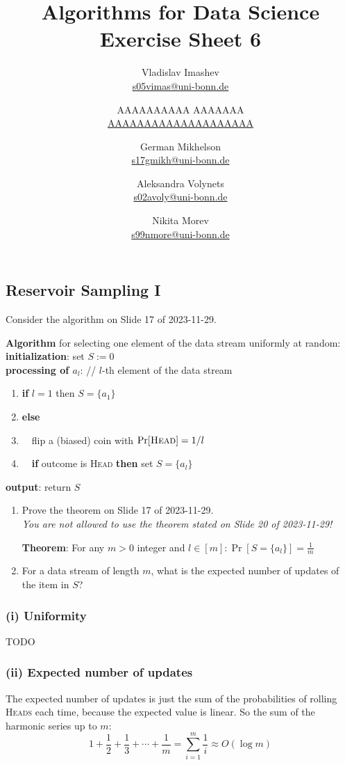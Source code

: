 \documentclass{article}
\title{Algorithms for Data Science \\ Exercise Sheet 6}
\author{
  Vladislav Imashev \\ \href{mailto:s05vimas@uni-bonn.de}{s05vimas@uni-bonn.de} \and
  AAAAAAAAAA AAAAAAA \\ \href{mailto:AAAAAAAAAAAAAAAAAAAA}{AAAAAAAAAAAAAAAAAAAA} \and
  German Mikhelson \\ \href{mailto:s17gmikh@uni-bonn.de}{s17gmikh@uni-bonn.de} \and
  Aleksandra Volynets \\ \href{mailto:s02avoly@uni-bonn.de}{s02avoly@uni-bonn.de} \and
  Nikita Morev \\ \href{mailto:s99nmore@uni-bonn.de}{s99nmore@uni-bonn.de}
}
\begin{document}
  \maketitle

  \setcounter{section}{6}
  \subsection{Reservoir Sampling I}
  \begin{centerframebox}
    Consider the algorithm on Slide 17 of 2023-11-29.

    \textbf{Algorithm} for selecting one element of the data stream uniformly at random: \\
    \textbf{initialization}: set $S := 0$ \\
    \textbf{processing of $a_l$}: // $l$-th element of the data stream
    \begin{enumerate}[topsep=0pt,itemsep=-1ex,partopsep=1ex,parsep=1ex]
      \item \textbf{if} $l = 1$ then $S = \{a_1\}$
      \item \textbf{else}
      \item ~~flip a (biased) coin with $\Pr[\textsc{Head}] = 1/l$
      \item ~~\textbf{if} outcome is \textsc{Head} \textbf{then} set $S = \{a_l\}$
    \end{enumerate}
    \textbf{output}: return $S$

    \begin{enumerate}[label=(\roman*)]
      \item Prove the theorem on Slide 17 of 2023-11-29. \\
      \textit{You are not allowed to use the theorem stated on Slide 20 of 2023-11-29!}

      \textbf{Theorem}: For any $m > 0$ integer and $l \in [m]: \Pr[S = \{a_l\}] = \frac{1}{m}$

      \item For a data stream of length $m$, what is the expected number of updates of the item in $S$?
    \end{enumerate}
  \end{centerframebox}
  \subsubsection*{(i) Uniformity}
  TODO%

  \subsubsection*{(ii) Expected number of updates}
  The expected number of updates is just the sum of the probabilities of rolling \textsc{Heads} each time,
  because the expected value is linear.
  So the sum of the harmonic series up to $m$:
  \[ 1+\frac{1}{2}+\frac{1}{3} + \cdots + \frac{1}{m} = \sum_{i=1}^m \frac{1}{i} \approx O(\log m) \]
\end{document}
